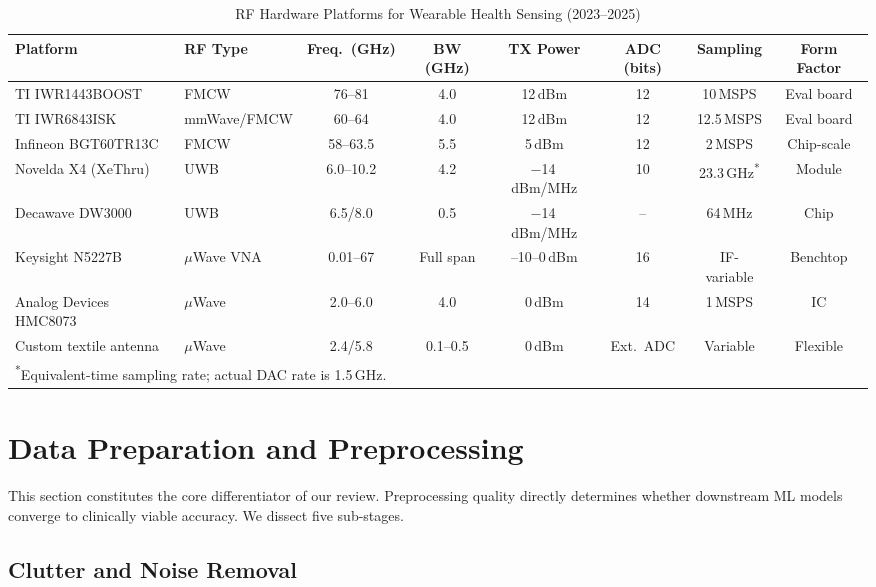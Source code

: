 \documentclass[journal,twoside]{IEEEtran}
\begin{document}
\begin{table}[!t]
\centering
\caption{RF Hardware Platforms for Wearable Health Sensing (2023--2025)}
\label{tab:hardware}
\small
\begin{tabular}{@{}llcccccc@{}}
\toprule
\textbf{Platform} & \textbf{RF Type} & \textbf{Freq.\ (GHz)} & \textbf{BW (GHz)} & \textbf{TX Power} & \textbf{ADC (bits)} & \textbf{Sampling} & \textbf{Form Factor} \\
\midrule
TI IWR1443BOOST & FMCW & 76--81 & 4.0 & 12\,dBm & 12 & 10\,MSPS & Eval board \\
TI IWR6843ISK & mmWave/FMCW & 60--64 & 4.0 & 12\,dBm & 12 & 12.5\,MSPS & Eval board \\
Infineon BGT60TR13C & FMCW & 58--63.5 & 5.5 & 5\,dBm & 12 & 2\,MSPS & Chip-scale \\
Novelda X4 (XeThru) & UWB & 6.0--10.2 & 4.2 & $-$14\,dBm/MHz & 10 & 23.3\,GHz\textsuperscript{*} & Module \\
Decawave DW3000 & UWB & 6.5/8.0 & 0.5 & $-$14\,dBm/MHz & -- & 64\,MHz & Chip \\
Keysight N5227B & $\mu$Wave VNA & 0.01--67 & Full span & --10--0\,dBm & 16 & IF-variable & Benchtop \\
Analog Devices HMC8073 & $\mu$Wave & 2.0--6.0 & 4.0 & 0\,dBm & 14 & 1\,MSPS & IC \\
Custom textile antenna & $\mu$Wave & 2.4/5.8 & 0.1--0.5 & 0\,dBm & Ext.\ ADC & Variable & Flexible \\
\bottomrule
\multicolumn{8}{l}{\textsuperscript{*}Equivalent-time sampling rate; actual DAC rate is 1.5\,GHz.}
\end{tabular}
\end{table}


\section{Data Preparation and Preprocessing}

This section constitutes the core differentiator of our review. Preprocessing quality directly determines whether downstream ML models converge to clinically viable accuracy. We dissect five sub-stages.

\subsection{Clutter and Noise Removal}
\end{document}
